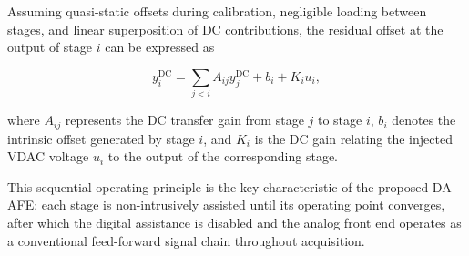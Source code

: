 Assuming quasi-static offsets during calibration, negligible loading between stages, and linear superposition of DC contributions, the residual offset at the output of stage $i$ can be expressed as

\begin{equation}
 y_i^{\mathrm{DC}} =
 \sum_{j<i} A_{ij}y_j^{\mathrm{DC}}
 + b_i
 + K_i u_i,
 \label{eq:stage}
\end{equation}

where $A_{ij}$ represents the DC transfer gain from stage $j$ to stage $i$, $b_i$ denotes the intrinsic offset generated by stage $i$, and $K_i$ is the DC gain relating the injected VDAC voltage $u_i$ to the output of the corresponding stage.

This sequential operating principle is the key characteristic of the proposed DA-AFE: each stage is non-intrusively assisted until its operating point converges, after which the digital assistance is disabled and the analog front end operates as a conventional feed-forward signal chain throughout acquisition.
